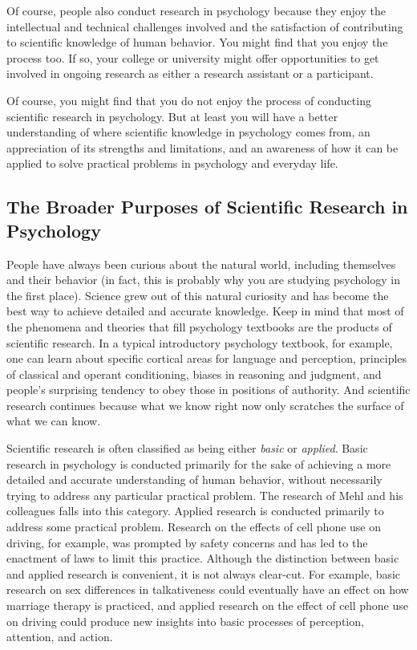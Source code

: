 Of course, people also conduct research in psychology because they enjoy the intellectual and technical challenges involved and the satisfaction of contributing to scientific knowledge of human behavior. You might find that you enjoy the process too. If so, your college or university might offer opportunities to get involved in ongoing research as either a research assistant or a participant. 


Of course, you might find that you do not enjoy the process of conducting scientific research in psychology. But at least you will have a better understanding of where scientific knowledge in psychology comes from, an appreciation of its strengths and limitations, and an awareness of how it can be applied to solve practical problems in psychology and everyday life.

\subsection{The Broader Purposes of Scientific Research in Psychology}
People have always been curious about the natural world, including themselves and their behavior (in fact, this is probably why you are studying psychology in the first place). Science grew out of this natural curiosity and has become the best way to achieve detailed and accurate knowledge. Keep in mind that most of the phenomena and theories that fill psychology textbooks are the products of scientific research. In a typical introductory psychology textbook, for example, one can learn about specific cortical areas for language and perception, principles of classical and operant conditioning, biases in reasoning and judgment, and people's surprising tendency to obey those in positions of authority. And scientific research continues because what we know right now only scratches the surface of what we can know.

Scientific research is often classified as being either \emph{basic} or \emph{applied}. Basic research in psychology is conducted primarily for the sake of achieving a more detailed and accurate understanding of human behavior, without necessarily trying to address any particular practical problem. The research of Mehl and his colleagues falls into this category. Applied research is conducted primarily to address some practical problem. Research on the effects of cell phone use on driving, for example, was prompted by safety concerns and has led to the enactment of laws to limit this practice. Although the distinction between basic and applied research is convenient, it is not always clear-cut. For example, basic research on sex differences in talkativeness could eventually have an effect on how marriage therapy is practiced, and applied research on the effect of cell phone use on driving could produce new insights into basic processes of perception, attention, and action.

